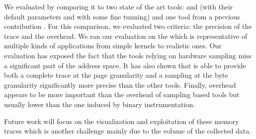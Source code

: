 We evaluated \Moca by comparing it to two state of the art tools: \Mitos and
\MemProf (with their default parameters and with some fine tunning) and one
tool from a previous contribution \TABARNAC. For this comparison, we evaluated
two criteria: the precision of the trace and the overhead. We ran our
evaluation on the \NPB which is representative of multiple kinds of applications from simple kernels
to realistic ones. Our evaluation has exposed the fact that the tools
relying on hardware sampling miss a significant part of the address space. It
has also shown that \Moca is able to provide both a complete trace at the page
granularity and a sampling at the byte granularity significantly more precise than the
other tools. Finally, \Moca overhead appears to be more important than the overhead of sampling
based tools but usually lower than the one induced by binary instrumentation.

Future work will focus on the visualization and exploitation of these memory traces
which is another challenge mainly due to the volume of the collected data.
